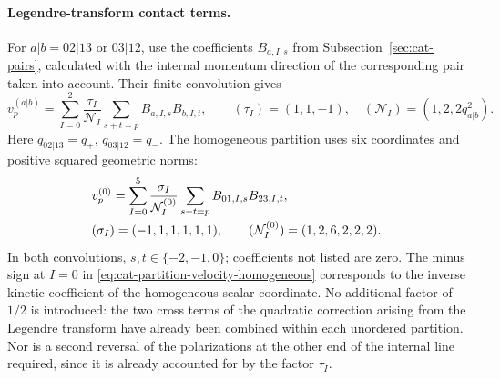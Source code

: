 \documentclass[11pt,a4paper]{article}
\begin{document}
\paragraph{Legendre-transform contact terms.}
For $a|b=02|13$ or $03|12$, use the coefficients $B_{a,I,s}$ from Subsection~\ref{sec:cat-pairs}, calculated with the internal momentum direction of the corresponding pair taken into account. Their finite convolution gives
\begin{equation}
 v_p^{(a|b)}=\sum_{I=0}^{2}\frac{\tau_I}{\mathcal N_I}
 \sum_{s+t=p}B_{a,I,s}B_{b,I,t},\qquad
 (\tau_I)=(1,1,-1),\quad (\mathcal N_I)=(1,2,2q_{a|b}^{2}).
\label{eq:cat-partition-velocity-nonzero}
\end{equation}
Here $q_{02|13}=q_+$, $q_{03|12}=q_-$. The homogeneous partition uses six coordinates and positive squared geometric norms:
\begin{equation}
\shortstack[l]{$\displaystyle v_p^{(0)}=\sum_{I=0}^{5}\frac{\sigma_I}{\mathcal N_I^{(0)}}
 \sum_{s+t=p}B_{01,I,s}B_{23,I,t},$\\
$\displaystyle (\sigma_I)=(-1,1,1,1,1,1),\qquad
 (\mathcal N_I^{(0)})=(1,2,6,2,2,2).$}
\label{eq:cat-partition-velocity-homogeneous}
\end{equation}
In both convolutions, $s,t\in\{-2,-1,0\}$; coefficients not listed are zero. The minus sign at $I=0$ in \eqref{eq:cat-partition-velocity-homogeneous} corresponds to the inverse kinetic coefficient of the homogeneous scalar coordinate. No additional factor of $1/2$ is introduced: the two cross terms of the quadratic correction arising from the Legendre transform have already been combined within each unordered partition. Nor is a second reversal of the polarizations at the other end of the internal line required, since it is already accounted for by the factor $\tau_I$.
\end{document}
